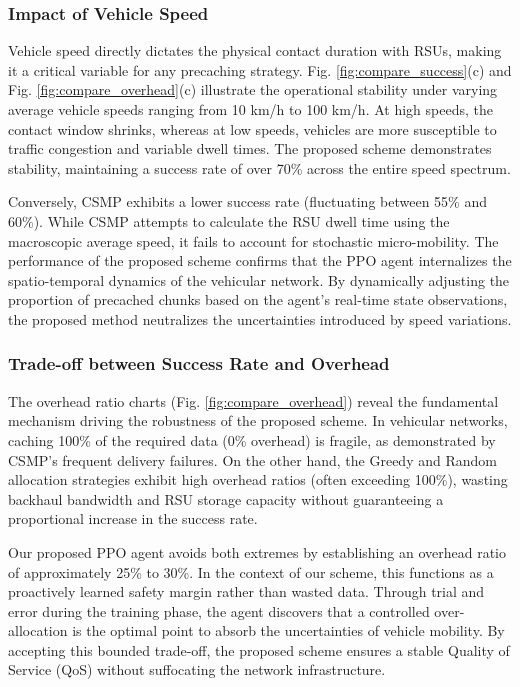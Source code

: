 \subsubsection{Impact of Vehicle Speed}
Vehicle speed directly dictates the physical contact duration with RSUs, making it a critical variable for any precaching strategy. Fig. \ref{fig:compare_success}(c) and Fig. \ref{fig:compare_overhead}(c) illustrate the operational stability under varying average vehicle speeds ranging from 10 km/h to 100 km/h. At high speeds, the contact window shrinks, whereas at low speeds, vehicles are more susceptible to traffic congestion and variable dwell times. The proposed scheme demonstrates stability, maintaining a success rate of over 70\% across the entire speed spectrum. 

Conversely, CSMP exhibits a lower success rate (fluctuating between 55\% and 60\%). While CSMP attempts to calculate the RSU dwell time using the macroscopic average speed, it fails to account for stochastic micro-mobility. The performance of the proposed scheme confirms that the PPO agent internalizes the spatio-temporal dynamics of the vehicular network. By dynamically adjusting the proportion of precached chunks based on the agent's real-time state observations, the proposed method neutralizes the uncertainties introduced by speed variations.



\subsubsection{Trade-off between Success Rate and Overhead}
The overhead ratio charts (Fig. \ref{fig:compare_overhead}) reveal the fundamental mechanism driving the robustness of the proposed scheme. In vehicular networks, caching 100\% of the required data (0\% overhead) is fragile, as demonstrated by CSMP's frequent delivery failures. On the other hand, the Greedy and Random allocation strategies exhibit high overhead ratios (often exceeding 100\%), wasting backhaul bandwidth and RSU storage capacity without guaranteeing a proportional increase in the success rate.

Our proposed PPO agent avoids both extremes by establishing an overhead ratio of approximately 25\% to 30\%. In the context of our scheme, this functions as a proactively learned safety margin rather than wasted data. Through trial and error during the training phase, the agent discovers that a controlled over-allocation is the optimal point to absorb the uncertainties of vehicle mobility. By accepting this bounded trade-off, the proposed scheme ensures a stable Quality of Service (QoS) without suffocating the network infrastructure.


